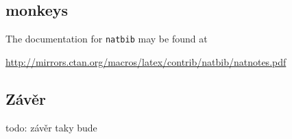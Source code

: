 \documentclass{article}
\begin{document}
\subsection{monkeys}
 \cite{monkeyExp}
 \cite{hamel1996competing}

The documentation for \verb+natbib+ may be found at
\begin{center}
  \url{http://mirrors.ctan.org/macros/latex/contrib/natbib/natnotes.pdf}
\end{center}


\subsection{Závěr}

todo: závěr taky bude 


  
  
\end{document}
